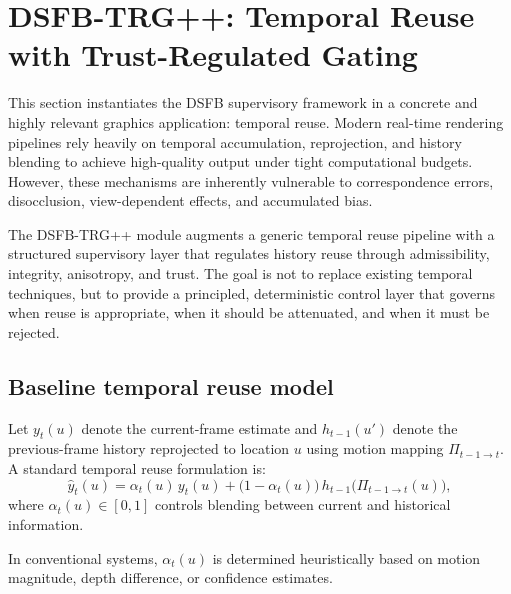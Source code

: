 \documentclass[11pt]{article}
\theoremstyle{definition}
\theoremstyle{plain}
\begin{document}

\section{DSFB-TRG++: Temporal Reuse with Trust-Regulated Gating}
\label{sec:trg}

This section instantiates the DSFB supervisory framework in a concrete and highly relevant graphics application: temporal reuse. Modern real-time rendering pipelines rely heavily on temporal accumulation, reprojection, and history blending to achieve high-quality output under tight computational budgets. However, these mechanisms are inherently vulnerable to correspondence errors, disocclusion, view-dependent effects, and accumulated bias.

The DSFB-TRG++ module augments a generic temporal reuse pipeline with a structured supervisory layer that regulates history reuse through admissibility, integrity, anisotropy, and trust. The goal is not to replace existing temporal techniques, but to provide a principled, deterministic control layer that governs when reuse is appropriate, when it should be attenuated, and when it must be rejected.


\subsection{Baseline temporal reuse model}

Let $y_t(u)$ denote the current-frame estimate and $h_{t-1}(u')$ denote the previous-frame history reprojected to location $u$ using motion mapping $\Pi_{t-1\rightarrow t}$. A standard temporal reuse formulation is:
\begin{equation}
\hat{y}_t(u)=\alpha_t(u)\,y_t(u) + \bigl(1-\alpha_t(u)\bigr)\,h_{t-1}\bigl(\Pi_{t-1\rightarrow t}(u)\bigr),
\end{equation}
where $\alpha_t(u)\in[0,1]$ controls blending between current and historical information.

In conventional systems, $\alpha_t(u)$ is determined heuristically based on motion magnitude, depth difference, or confidence estimates.

\end{document}
